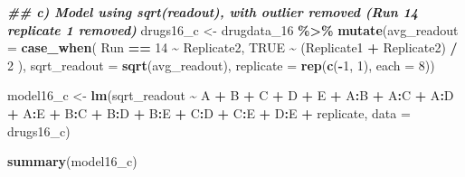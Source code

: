 \documentclass[
]{article}
\newenvironment{Shaded}{\begin{snugshade}}{\end{snugshade}}
\newcommand{\AttributeTok}[1]{\textcolor[rgb]{0.13,0.29,0.53}{#1}}
\newcommand{\ConstantTok}[1]{\textcolor[rgb]{0.56,0.35,0.01}{#1}}
\newcommand{\DecValTok}[1]{\textcolor[rgb]{0.00,0.00,0.81}{#1}}
\newcommand{\DocumentationTok}[1]{\textcolor[rgb]{0.56,0.35,0.01}{\textbf{\textit{#1}}}}
\newcommand{\FunctionTok}[1]{\textcolor[rgb]{0.13,0.29,0.53}{\textbf{#1}}}
\newcommand{\NormalTok}[1]{#1}
\newcommand{\OtherTok}[1]{\textcolor[rgb]{0.56,0.35,0.01}{#1}}
\newcommand{\SpecialCharTok}[1]{\textcolor[rgb]{0.81,0.36,0.00}{\textbf{#1}}}
\begin{document}
\begin{Shaded}
\begin{Highlighting}[]
\DocumentationTok{\#\# c) Model using sqrt(readout), with outlier removed (Run 14 replicate 1 removed)}
\NormalTok{drugs16\_c }\OtherTok{\textless{}{-}}\NormalTok{ drugdata\_16 }\SpecialCharTok{\%\textgreater{}\%}
  \FunctionTok{mutate}\NormalTok{(}\AttributeTok{avg\_readout =} \FunctionTok{case\_when}\NormalTok{(}
\NormalTok{    Run }\SpecialCharTok{==} \DecValTok{14} \SpecialCharTok{\textasciitilde{}}\NormalTok{ Replicate2,}
    \ConstantTok{TRUE} \SpecialCharTok{\textasciitilde{}}\NormalTok{ (Replicate1 }\SpecialCharTok{+}\NormalTok{ Replicate2) }\SpecialCharTok{/} \DecValTok{2}
\NormalTok{  ),}
  \AttributeTok{sqrt\_readout =} \FunctionTok{sqrt}\NormalTok{(avg\_readout),}
  \AttributeTok{replicate =} \FunctionTok{rep}\NormalTok{(}\FunctionTok{c}\NormalTok{(}\SpecialCharTok{{-}}\DecValTok{1}\NormalTok{, }\DecValTok{1}\NormalTok{), }\AttributeTok{each =} \DecValTok{8}\NormalTok{))}

\NormalTok{model16\_c }\OtherTok{\textless{}{-}} \FunctionTok{lm}\NormalTok{(sqrt\_readout }\SpecialCharTok{\textasciitilde{}}\NormalTok{ A }\SpecialCharTok{+}\NormalTok{ B }\SpecialCharTok{+}\NormalTok{ C }\SpecialCharTok{+}\NormalTok{ D }\SpecialCharTok{+}\NormalTok{ E }\SpecialCharTok{+}
\NormalTok{                  A}\SpecialCharTok{:}\NormalTok{B }\SpecialCharTok{+}\NormalTok{ A}\SpecialCharTok{:}\NormalTok{C }\SpecialCharTok{+}\NormalTok{ A}\SpecialCharTok{:}\NormalTok{D }\SpecialCharTok{+}\NormalTok{ A}\SpecialCharTok{:}\NormalTok{E }\SpecialCharTok{+}
\NormalTok{                  B}\SpecialCharTok{:}\NormalTok{C }\SpecialCharTok{+}\NormalTok{ B}\SpecialCharTok{:}\NormalTok{D }\SpecialCharTok{+}\NormalTok{ B}\SpecialCharTok{:}\NormalTok{E }\SpecialCharTok{+}
\NormalTok{                  C}\SpecialCharTok{:}\NormalTok{D }\SpecialCharTok{+}\NormalTok{ C}\SpecialCharTok{:}\NormalTok{E }\SpecialCharTok{+}\NormalTok{ D}\SpecialCharTok{:}\NormalTok{E }\SpecialCharTok{+}
\NormalTok{                  replicate,}
                \AttributeTok{data =}\NormalTok{ drugs16\_c)}

\FunctionTok{summary}\NormalTok{(model16\_c)}
\end{Highlighting}
\end{Shaded}
\end{document}
